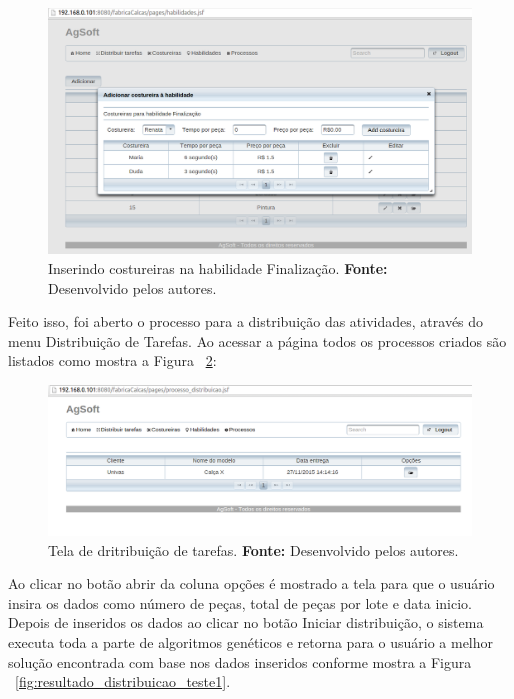 \newpage

\begin{figure}[h!]
	\centerline{\includegraphics[scale=0.4]{./imagens/tela_habilidade_teste1.png}}
	\caption[Inserindo costureiras na habilidade Finalização.]
	{Inserindo costureiras na habilidade Finalização. \textbf{Fonte:} Desenvolvido
	pelos autores.}
	\label{fig:costureira_habilidade}
\end{figure}


\par Feito isso, foi aberto o processo para a distribuição
das atividades, através do menu Distribuição de Tarefas.
Ao acessar a página todos os processos criados são
listados como mostra a Figura ~\ref{fig:distribuicao_tarefas}:

\begin{figure}[h!]
	\centerline{\includegraphics[scale=0.3]{./imagens/tela_distribuicao_tarefas.png}}
	\caption[Tela de distribuição de tarefas.]
	{Tela de dritribuição de tarefas. \textbf{Fonte:} Desenvolvido
	pelos autores.}
	\label{fig:distribuicao_tarefas}
\end{figure}


\par Ao clicar no botão abrir da coluna opções é mostrado a tela para que o
usuário insira os dados como número de peças, total de peças por lote e data inicio. Depois de
inseridos os dados ao clicar no botão Iniciar distribuição, o sistema executa
toda a parte de algoritmos genéticos e retorna para o usuário a melhor solução
encontrada com base nos dados inseridos conforme mostra a Figura
~\ref{fig:resultado_distribuicao_teste1}.

